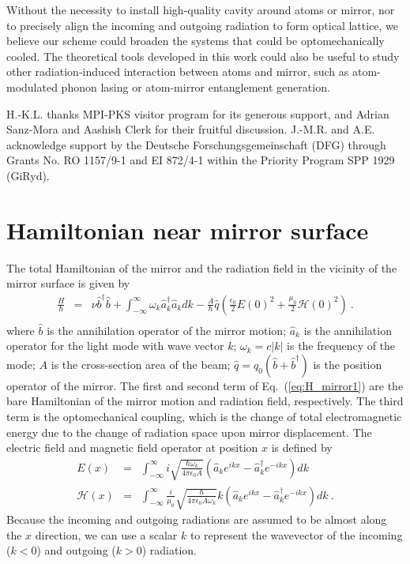 \documentclass[aps, pra, reprint, amsmath, amssymb, groupedaddress, acknowledgments]{revtex4-1}
\begin{document}
Without the necessity to install high-quality cavity around atoms or mirror, nor to precisely align the incoming and outgoing radiation to form optical lattice, we believe our scheme could broaden the systems that could be optomechanically cooled.  The theoretical tools developed in this work could also be useful to study other radiation-induced interaction between atoms and mirror, such as atom-modulated phonon lasing or atom-mirror entanglement generation.

\begin{acknowledgments}
H.-K.L. thanks MPI-PKS visitor program for its generous support, and Adrian Sanz-Mora and Aashish Clerk for their fruitful discussion.  J.-M.R. and A.E. acknowledge support by the Deutsche Forschungsgemeinschaft (DFG) through Grants No. RO 1157/9-1 and EI 872/4-1 within the Priority Program SPP 1929 (GiRyd).
\end{acknowledgments}

\appendix

\section{Hamiltonian near mirror surface \label{app:H_mirror}}

The total Hamiltonian of the mirror and the radiation field in the vicinity of the mirror surface is given by
\begin{eqnarray}
\frac{H}{\hbar}&=& \nu \hat{b}^\dag \hat{b}+ \int_{-\infty}^\infty  \omega_k \hat{a}^\dag_k\hat{a}_k dk  -\frac{A}{\hbar} \hat{q}\left(  \frac{\epsilon_0}{2}E(0)^2 +  \frac{\mu_0}{2} \mathcal{H}(0)^2 \right) ~. \nonumber\\\label{eq:H_mirror1}
\end{eqnarray}
where $\hat{b}$ is the annihilation operator of the mirror motion; $\hat{a}_k$ is the annihilation operator for the light mode with wave vector $k$; $\omega_k=c|k|$ is the frequency of the mode; $A$ is the cross-section area of the beam; $\hat{q}=q_0(\hat{b}+\hat{b}^\dag)$ is the position operator of the mirror.  The first and second term of Eq.~(\ref{eq:H_mirror1}) are the bare Hamiltonian of the mirror motion and radiation field, respectively.  
The third term is the optomechanical coupling, which is the change of total electromagnetic energy due to the change of radiation space upon mirror displacement.  The electric field and magnetic field operator at position $x$ is defined by
\begin{eqnarray}
E(x) &=& \int^\infty_{-\infty} i \sqrt{\frac{\hbar \omega_k}{4 \pi \epsilon_0 A}} (\hat{a}_k e^{ikx}-\hat{a}^\dag_k e^{-ikx})dk \nonumber \\
\mathcal{H}(x) &=& \int^\infty_{-\infty} \frac{i}{\mu_0} \sqrt{\frac{\hbar}{4 \pi \epsilon_0 A \omega_k}} k(\hat{a}_k e^{ikx}-\hat{a}^\dag_k e^{-ikx})dk~. \label{eq:def_EH} \nonumber
\end{eqnarray}
Because the incoming and outgoing radiations are assumed to be almost along the $x$ direction, 
we can use a scalar $k$ to represent the wavevector of the incoming ($k<0$) and outgoing ($k>0$) radiation.
\end{document}
